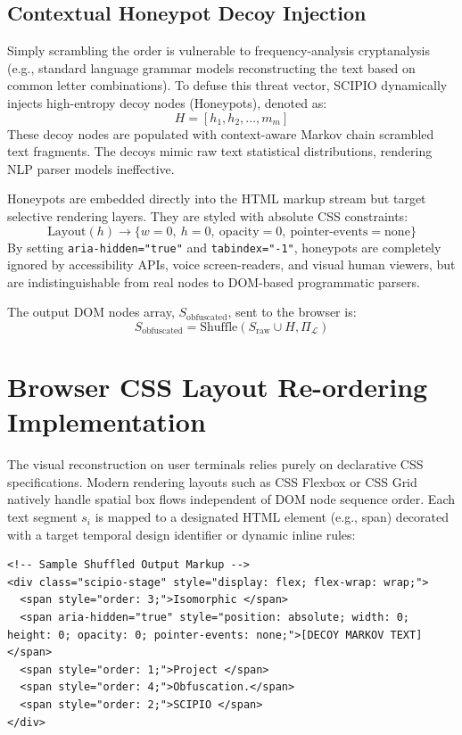 \documentclass[10pt,journal,compsoc]{IEEEtran}
\begin{document}
\subsection{Contextual Honeypot Decoy Injection}
Simply scrambling the order is vulnerable to frequency-analysis cryptanalysis (e.g., standard language grammar models reconstructing the text based on common letter combinations). To defuse this threat vector, SCIPIO dynamically injects high-entropy decoy nodes (Honeypots), denoted as:
\begin{equation}
    H = [h_1, h_2, \dots, m_m]
\end{equation}
These decoy nodes are populated with context-aware Markov chain scrambled text fragments. The decoys mimic raw text statistical distributions, rendering NLP parser models ineffective. 

Honeypots are embedded directly into the HTML markup stream but target selective rendering layers. They are styled with absolute CSS constraints:
\begin{equation}
    \text{Layout}(h) \to \{ w=0, \ h=0, \ \text{opacity}=0, \ \text{pointer-events}=\text{none} \}
\end{equation}
By setting \texttt{aria-hidden="true"} and \texttt{tabindex="-1"}, honeypots are completely ignored by accessibility APIs, voice screen-readers, and visual human viewers, but are indistinguishable from real nodes to DOM-based programmatic parsers.

The output DOM nodes array, $S_{\text{obfuscated}}$, sent to the browser is:
\begin{equation}
    S_{\text{obfuscated}} = \text{Shuffle}(S_{\text{raw}} \cup H, \Pi_{\mathcal{L}})
\end{equation}

\section{Browser CSS Layout Re-ordering Implementation}
The visual reconstruction on user terminals relies purely on declarative CSS specifications. Modern rendering layouts such as CSS Flexbox or CSS Grid natively handle spatial box flows independent of DOM node sequence order. Each text segment $s_i$ is mapped to a designated HTML element (e.g., span) decorated with a target temporal design identifier or dynamic inline rules:
\lstset{language=HTML}
\begin{lstlisting}
<!-- Sample Shuffled Output Markup -->
<div class="scipio-stage" style="display: flex; flex-wrap: wrap;">
  <span style="order: 3;">Isomorphic </span>
  <span aria-hidden="true" style="position: absolute; width: 0; height: 0; opacity: 0; pointer-events: none;">[DECOY MARKOV TEXT]</span>
  <span style="order: 1;">Project </span>
  <span style="order: 4;">Obfuscation.</span>
  <span style="order: 2;">SCIPIO </span>
</div>
\end{lstlisting}
\end{document}
